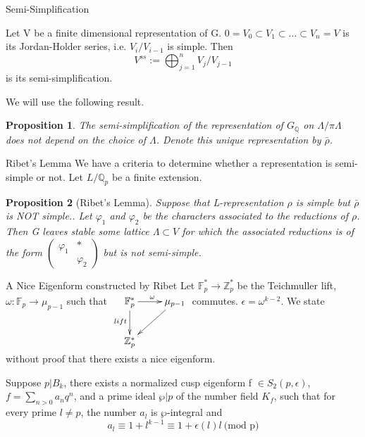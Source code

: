 \documentclass{beamer}
\theoremstyle{plain}
\newtheorem{proposition}{Proposition}[section]
\theoremstyle{definition}
\theoremstyle{remark}
\newcommand{\Q}{\mathbb{Q}}
\newcommand{\Z}{\mathbb{Z}}
\begin{document}
\begin{frame}{Semi-Simplification}
    \begin{definition}
        Let V be a finite dimensional representation of G. $0=V_0\subset V_1 \subset
            \dots \subset V_n=V$ is its Jordan-Holder series, i.e. $V_i/V_{i-1}$ is simple. Then
        \[V^{ss}:= \bigoplus_{j=1}^{n} V_j/V_{j-1} \]
        is its semi-simplification.
    \end{definition}
    We will use the following result.
    \begin{proposition}
        The semi-simplification of the representation of $G_{\Q}$ on $\Lambda/\pi \Lambda$ does not depend on
        the choice of $\Lambda$. Denote this unique representation by $\bar{\rho}$.
    \end{proposition}
\end{frame}

\begin{frame}{Ribet's Lemma}
    We have a criteria to determine whether a representation is semi-simple or not. Let $L/\Q_p$ be a finite extension.
    \begin{proposition}[Ribet's Lemma]
        Suppose that L-representation $\rho$ is simple but $\bar{\rho}$ is NOT simple..
        Let $\varphi_1$ and $\varphi_2$ be the characters associated to the reductions of
        $\rho$. Then G leaves stable some lattice $\Lambda \subset V$ for which the associated
        reductions is of the form $\begin{pmatrix}
                \varphi_1 & *         \\
                          & \varphi_2
            \end{pmatrix}$   but is not semi-simple.
    \end{proposition}
\end{frame}


\begin{frame}{A Nice Eigenform constructed by Ribet}
    Let $\mathbb{F}_p^* \to
        \Z_p^*$ be the Teichmuller lift, $\omega: \mathbb{F}_p \to \mu_{p-1}$ such that $\xymatrix{
            \mathbb{F}_p^* \ar[r]^{\omega} \ar[d]_{lift} & \mu_{p-1} \ar[ld] \\
            \Z_p^* &
        } $ commutes. $\epsilon=\omega^{k-2}$. We state without proof that there exists a nice eigenform.
    \begin{theorem}
        Suppose $p| B_k$, there exists a normalized cusp eigenform f $\in S_2(p,\epsilon)$,
        $f=\sum_{n>0}a_nq^n$, and a prime ideal $\wp |p$ of the number field $K_f$, such that for every prime $l \ne p$,
        the number $a_l$ is $\wp$-integral and
        \[a_l \equiv 1+l^{k-1} \equiv 1+ \epsilon(l)l \ \text{(mod p)}\]
    \end{theorem}
\end{frame}
\end{document}
